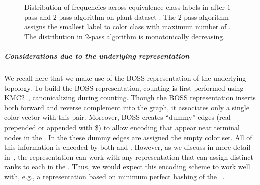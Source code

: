 \begin{figure}[h]
\centering
{}
    \caption{
    Distribution of \kmer frequencies across equivalence class labels in \system
    after $1$-pass and $2$-pass algorithm on plant dataset
    . The $2$-pass algorithm assigns the smallest label
    to color class with maximum number of \kmers. The distribution in $2$-pass
    algorithm is monotonically decreasing. 
  }
      \label{fig:plant-eq-class-dist}
\end{figure}

\subparagraph{Considerations due to the underlying \dbg representation} We recall here that we make use of the BOSS representation of the underlying \dbg topology. To build the BOSS representation, \kmer counting is first performed using KMC2~\cite{Deorowicz15KMC}, canonicalizing \kmers during counting. Though the BOSS representation inserts both forward and reverse complement \kmers into the graph, it associates only a single color vector with this pair.  Moreover, BOSS creates ``dummy'' edges (real \kmers prepended or appended with \$) to allow encoding \kmers that appear near terminal nodes in the \dbg. In the \cdbg these dummy edges are assigned the empty color set. All of this information is encoded by both \vari and \system. However, as we discuss in more detail in~, the \system representation can work with any \dbg representation that can assign distinct ranks to each \kmer in the \dbg. Thus, we would expect this encoding scheme to work well with, e.g., a \dbg representation based on minimum perfect hashing of the
\kmers~\cite{drezen2014gatb}.


